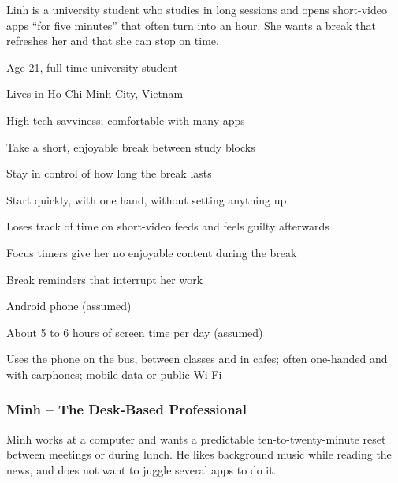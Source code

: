 Linh is a university student who studies in long sessions and opens
short-video apps ``for five minutes'' that often turn into an hour. She wants
a break that refreshes her and that she can stop on time.

  {\item Age 21, full-time university student
   \item Lives in Ho Chi Minh City, Vietnam
   \item High tech-savviness; comfortable with many apps}
  {\item Take a short, enjoyable break between study blocks
   \item Stay in control of how long the break lasts
   \item Start quickly, with one hand, without setting anything up}
  {\item Loses track of time on short-video feeds and feels guilty afterwards
   \item Focus timers give her no enjoyable content during the break
   \item Break reminders that interrupt her work}
  {\item Android phone (assumed)
   \item About 5 to 6 hours of screen time per day (assumed)
   \item Uses the phone on the bus, between classes and in cafes; often
         one-handed and with earphones; mobile data or public Wi-Fi}

\subsubsection{Minh -- The Desk-Based Professional}

Minh works at a computer and wants a predictable ten-to-twenty-minute reset
between meetings or during lunch. He likes background music while reading the
news, and does not want to juggle several apps to do it.

